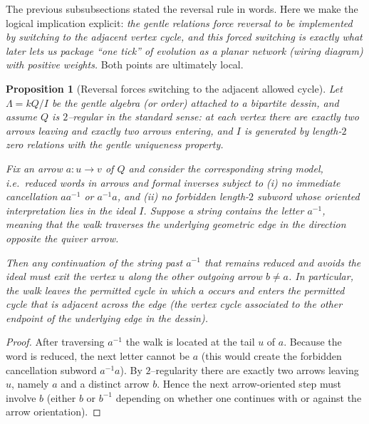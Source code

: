 \documentclass[11pt,oneside]{amsbook}
\numberwithin{equation}{section}
\theoremstyle{plain}
\newtheorem{proposition}[theorem]{Proposition}
\theoremstyle{definition}
\theoremstyle{remark}
\begin{document}
\begin{enumerate}
The previous subsubsections stated the reversal rule in words.
Here we make the logical implication explicit: \emph{the gentle relations force reversal to be implemented by switching to the adjacent vertex cycle, and this forced switching is exactly what later lets us package ``one tick'' of evolution as a planar network (wiring diagram) with positive weights.}
Both points are ultimately local.

\begin{proposition}[Reversal forces switching to the adjacent allowed cycle]
\label{prop:reversal_forces_switching_adjacent_cycle}
Let $\Lambda=kQ/I$ be the gentle algebra (or order) attached to a bipartite dessin, and assume $Q$ is $2$--regular in the standard sense: at each vertex there are exactly two arrows leaving and exactly two arrows entering, and $I$ is generated by length-$2$ zero relations with the gentle uniqueness property.

Fix an arrow $a:u\to v$ of $Q$ and consider the corresponding \emph{string} model, i.e.\ reduced words in arrows and formal inverses subject to
(i) no immediate cancellation $aa^{-1}$ or $a^{-1}a$, and
(ii) no forbidden length-$2$ subword whose oriented interpretation lies in the ideal $I$.
Suppose a string contains the letter $a^{-1}$, meaning that the walk traverses the underlying geometric edge in the direction \emph{opposite} the quiver arrow.

Then any continuation of the string past $a^{-1}$ that remains reduced and avoids the ideal must \emph{exit the vertex $u$ along the other outgoing arrow} $b\neq a$.
In particular, the walk leaves the permitted cycle in which $a$ occurs and enters the permitted cycle that is adjacent across the edge (the vertex cycle associated to the other endpoint of the underlying edge in the dessin).
\end{proposition}

\begin{proof}
After traversing $a^{-1}$ the walk is located at the tail $u$ of $a$.
Because the word is reduced, the next letter cannot be $a$ (this would create the forbidden cancellation subword $a^{-1}a$).
By $2$--regularity there are exactly two arrows leaving $u$, namely $a$ and a distinct arrow $b$.
Hence the next arrow-oriented step must involve $b$ (either $b$ or $b^{-1}$ depending on whether one continues with or against the arrow orientation).


\end{proof}
\end{enumerate}
\end{document}
